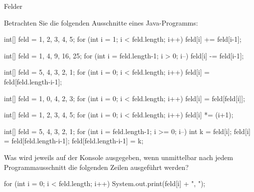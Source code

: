 \begin{exercise}{Felder}
\begin{body}
Betrachten Sie die folgenden Ausschnitte eines Java-Programms:
\begin{parts}
\item 
\begin{displaycode}
    int[] feld = {1, 2, 3, 4, 5};
    for (int i = 1; i < feld.length; i++) {
         feld[i] += feld[i-1];
    }
\end{displaycode}

\item
\begin{displaycode}
    int[] feld = {1, 4, 9, 16, 25};
    for (int i = feld.length-1; i > 0; i--) {
        feld[i] -= feld[i-1];
    }
\end{displaycode}


\item
\begin{displaycode}
    int[] feld = {5, 4, 3, 2, 1};
    for (int i = 0; i < feld.length; i++) {
        feld[i] = feld[feld.length-i-1];
    }
\end{displaycode}

\item
\begin{displaycode}
    int[] feld = {1, 0, 4, 2, 3};
    for (int i = 0; i < feld.length; i++) {
        feld[i] = feld[feld[i]];
    }
\end{displaycode}

\item
\begin{displaycode}
    int[] feld = {1, 2, 3, 4, 5};
    for (int i = 0; i < feld.length; i++) {
        feld[i] *= (i+1);
    }
\end{displaycode}

\item
\begin{displaycode}
    int[] feld = {5, 4, 3, 2, 1};
    for (int i = feld.length-1; i >= 0; i--) {
        int k = feld[i];
        feld[i] = feld[feld.length-i-1];
        feld[feld.length-i-1] = k;
    }
\end{displaycode}
\end{parts}
Was wird jeweils auf der Konsole ausgegeben, wenn unmittelbar nach jedem Programmausschnitt die folgenden Zeilen
ausgeführt werden?
\medskip
\begin{displaycode}
    for (int i = 0; i < feld.length; i++) {
        System.out.print(feld[i] + ", ");
    }
\end{displaycode}
\end{body}



\end{exercise}
